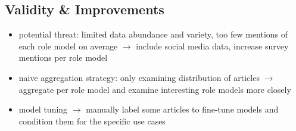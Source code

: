     \subsection*{Validity \& Improvements}
    \begin{itemize}
        \item potential threat: limited data abundance and variety, too few mentions of each role model on average $\rightarrow$ include social media data, increase survey mentions per role model
        \item naive aggregation strategy: only examining distribution of articles $\rightarrow$ aggregate per role model and examine interesting role models more closely
        \item model tuning $\rightarrow$ manually label some articles to fine-tune models and condition them for the specific use cases
    \end{itemize}
